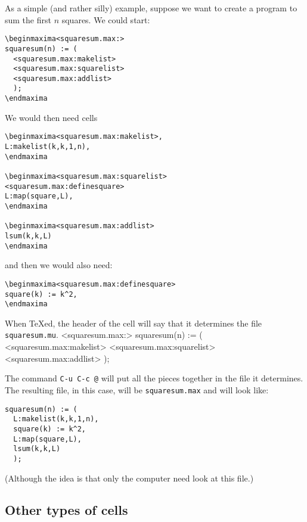 \documentclass{article}
\begin{document}
As a simple (and rather silly) example, suppose we want to create a
program to sum the first $n$ squares.  We could start:
\begin{verbatim}
\beginmaxima<squaresum.max:>
squaresum(n) := (
  <squaresum.max:makelist>
  <squaresum.max:squarelist>
  <squaresum.max:addlist>
  );        
\endmaxima
\end{verbatim}
\noindent
We would then need cells
\begin{verbatim}
\beginmaxima<squaresum.max:makelist>,
L:makelist(k,k,1,n),
\endmaxima

\beginmaxima<squaresum.max:squarelist>
<squaresum.max:definesquare>
L:map(square,L),
\endmaxima

\beginmaxima<squaresum.max:addlist>
lsum(k,k,L)
\endmaxima
\end{verbatim}
\noindent
and then we would also need:
\begin{verbatim}
\beginmaxima<squaresum.max:definesquare>
square(k) := k^2,
\endmaxima
\end{verbatim}
\noindent
When \TeX{}ed, the header of the cell will say that it determines the
file \texttt{squaresum.mu}.  
\beginmaxima<squaresum.max:>
squaresum(n) := (
  <squaresum.max:makelist>
  <squaresum.max:squarelist>
  <squaresum.max:addlist>
  );        
\endmaxima

The command 
\texttt{C-u C-c @} will put all the pieces
together in the file it determines.  The resulting file, in this case,
will be \texttt{squaresum.max} and will look like:
\begin{verbatim}
squaresum(n) := (
  L:makelist(k,k,1,n),
  square(k) := k^2,
  L:map(square,L),
  lsum(k,k,L)
  );        
\end{verbatim}
\noindent
(Although the idea is that only the computer need look at this file.)

\subsection{Other types of cells}
\end{document}
